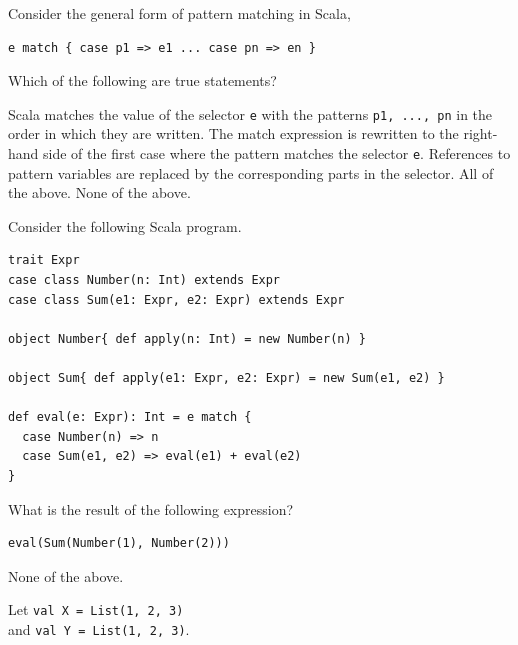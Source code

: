 \begin{questions}
\newpage


\question[3] %

Consider the general form of pattern matching in Scala,

\begin{verbatim}
e match { case p1 => e1 ... case pn => en }
\end{verbatim}

Which of the following are true statements?

\begin{checkboxes}
\choice Scala matches the value of the selector \texttt{e} with the patterns \texttt{p1, ..., pn} in the order in which they are written.
\choice The match expression is rewritten to the right-hand side of the first case where the pattern matches the selector \texttt{e}.
\choice References to pattern variables are replaced by the corresponding parts in the selector.
\CorrectChoice All of the above.
\choice None of the above.
\end{checkboxes}

\medskip

\question[3] Consider the following Scala program.

\begin{verbatim}
trait Expr
case class Number(n: Int) extends Expr
case class Sum(e1: Expr, e2: Expr) extends Expr

object Number{ def apply(n: Int) = new Number(n) }

object Sum{ def apply(e1: Expr, e2: Expr) = new Sum(e1, e2) }

def eval(e: Expr): Int = e match {
  case Number(n) => n
  case Sum(e1, e2) => eval(e1) + eval(e2)
}
\end{verbatim}

What is the result of the following expression?

\begin{verbatim}
eval(Sum(Number(1), Number(2)))
\end{verbatim}

\begin{oneparcheckboxes}
\choice None of the above.
\end{oneparcheckboxes}

\newpage

  \question[6]
Let \texttt{val X = List(1, 2, 3)}\\
\phantom{(6 pts)} and \texttt{val Y = List(1, 2, 3)}.


\end{questions}
